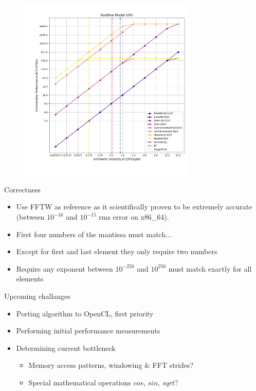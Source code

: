 \documentclass{beamer}
\begin{document}
\begin{frame}
	\begingroup
	\small
	\begin{figure}
		\includegraphics[width=0.75\textwidth,center]{resources/images/roof-gpu.png}
	\end{figure}
	\endgroup
\end{frame}

\begin{frame}{Correctness}
	\begingroup
	\small
	\begin{itemize}
		\item Use FFTW as reference as it scientifically proven to be extremely
		accurate (between $10^{-16}$ and $10^{-15}$ rms error on x86\_64).
		\item First four numbers of the mantissa must match...
		\item Except for first and last element they only require two numbers
		\item Require any exponent between $10^{-250}$ and $10^{250}$ must
		match exactly for all elements
	\end{itemize}
	\endgroup
\end{frame}

\begin{frame}{Upcoming challanges}
	\begingroup
	\small
	\begin{itemize}
		\item Porting algorithm to OpenCL, first priority
		\item Performing initial performance measurements
		\item Determining current bottleneck 
		\begin{itemize}
			\item Memory access patterns, windowing \& FFT strides?
			\item Special mathematical operations $cos$, $sin$, $sqrt$?
		\end{itemize}
	\end{itemize}
	\endgroup
\end{frame}
\end{document}
